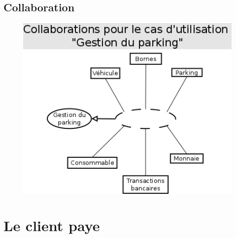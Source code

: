 \documentclass[a4paper]{article}
\begin{document}
\subsection{Collaboration}
\begin{figure}[!ht]
\centering
\includegraphics[scale=.5]{collaborations/_gestion_parking.png}
\end{figure}

\newpage

\section{Le client paye}
\end{document}
